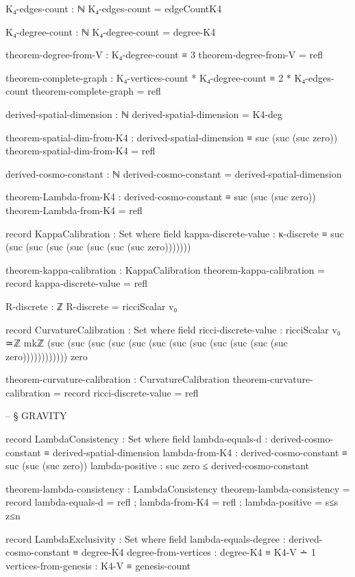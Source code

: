 \documentclass[11pt,a4paper]{book}
\begin{document}
\begin{code}
K₄-edges-count : ℕ
K₄-edges-count = edgeCountK4

K₄-degree-count : ℕ
K₄-degree-count = degree-K4

theorem-degree-from-V : K₄-degree-count ≡ 3
theorem-degree-from-V = refl

theorem-complete-graph : K₄-vertices-count * K₄-degree-count ≡ 2 * K₄-edges-count
theorem-complete-graph = refl


derived-spatial-dimension : ℕ
derived-spatial-dimension = K4-deg

theorem-spatial-dim-from-K4 : derived-spatial-dimension ≡ suc (suc (suc zero))
theorem-spatial-dim-from-K4 = refl

derived-cosmo-constant : ℕ
derived-cosmo-constant = derived-spatial-dimension

theorem-Lambda-from-K4 : derived-cosmo-constant ≡ suc (suc (suc zero))
theorem-Lambda-from-K4 = refl

record KappaCalibration : Set where
  field
    kappa-discrete-value : κ-discrete ≡ suc (suc (suc (suc (suc (suc (suc (suc zero)))))))
    
theorem-kappa-calibration : KappaCalibration
theorem-kappa-calibration = record
  { kappa-discrete-value = refl
  }

R-discrete : ℤ
R-discrete = ricciScalar v₀

record CurvatureCalibration : Set where
  field
    ricci-discrete-value : ricciScalar v₀ ≃ℤ mkℤ (suc (suc (suc (suc (suc (suc (suc 
                            (suc (suc (suc (suc (suc zero)))))))))))) zero
    
theorem-curvature-calibration : CurvatureCalibration
theorem-curvature-calibration = record
  { ricci-discrete-value = refl
  }


-- § GRAVITY

record LambdaConsistency : Set where
  field
    lambda-equals-d     : derived-cosmo-constant ≡ derived-spatial-dimension
    lambda-from-K4      : derived-cosmo-constant ≡ suc (suc (suc zero))
    lambda-positive     : suc zero ≤ derived-cosmo-constant

theorem-lambda-consistency : LambdaConsistency
theorem-lambda-consistency = record
  { lambda-equals-d = refl
  ; lambda-from-K4  = refl
  ; lambda-positive = s≤s z≤n
  }

record LambdaExclusivity : Set where
  field
    lambda-equals-degree : derived-cosmo-constant ≡ degree-K4
    degree-from-vertices : degree-K4 ≡ K4-V ∸ 1
    vertices-from-genesis : K4-V ≡ genesis-count


\end{code}
\end{document}
